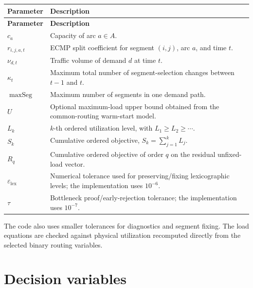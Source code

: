 \documentclass[11pt,a4paper]{article}
\newcommand{\maxSeg}{\operatorname{maxSeg}}
\begin{document}
\begin{longtable}{
    >{\raggedright\arraybackslash}p{}
    >{\raggedright\arraybackslash}p{}
}
\toprule
\textbf{Parameter} & \textbf{Description} \\
\midrule
\endfirsthead
\toprule
\textbf{Parameter} & \textbf{Description} \\
\midrule
\endhead

$c_a$ & Capacity of arc $a\in A$. \\[0.4em]
$r_{i,j,a,t}$ & ECMP split coefficient for segment $(i,j)$, arc $a$, and time $t$. \\[0.4em]
$\nu_{d,t}$ & Traffic volume of demand $d$ at time $t$. \\[0.4em]
$\kappa_t$ & Maximum total number of segment-selection changes between $t-1$ and $t$. \\[0.4em]
$\maxSeg$ & Maximum number of segments in one demand path. \\[0.4em]
$U$ & Optional maximum-load upper bound obtained from the common-routing warm-start model. \\[0.4em]
$L_k$ & $k$-th ordered utilization level, with $L_1\geq L_2\geq\cdots$. \\[0.4em]
$S_k$ & Cumulative ordered objective, $S_k=\sum_{j=1}^{k}L_j$. \\[0.4em]
$R_q$ & Cumulative ordered objective of order $q$ on the residual unfixed-load vector. \\[0.4em]
$\varepsilon_{\mathrm{lex}}$ & Numerical tolerance used for preserving/fixing lexicographic levels; the implementation uses $10^{-6}$. \\[0.4em]
$\tau$ & Bottleneck proof/early-rejection tolerance; the implementation uses $10^{-7}$. \\
\bottomrule
\end{longtable}

The code also uses smaller tolerances for diagnostics and segment fixing. The
load equations are checked against physical utilization recomputed directly
from the selected binary routing variables.

\section{Decision variables}
\end{document}
